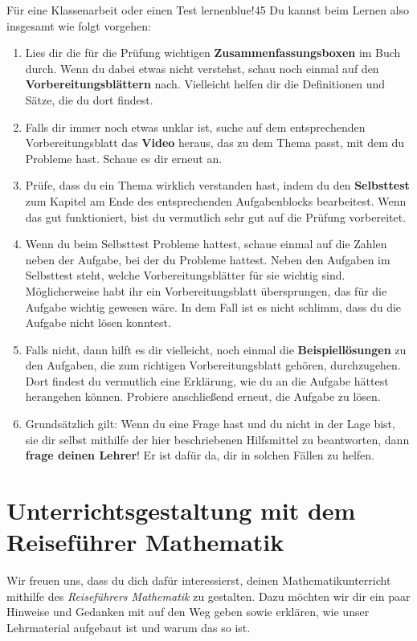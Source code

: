 \documentclass[../main.tex]{subfiles}
\begin{document}
\begin{goal}{Für eine Klassenarbeit oder einen Test lernen}{blue!45}
    Du kannst beim Lernen also insgesamt wie folgt vorgehen:
    \begin{enumerate}
        \item[\tikzball{blue!50!black}{1}] Lies dir die für die Prüfung wichtigen \textbf{Zusammenfassungsboxen} im Buch durch. Wenn du dabei etwas nicht verstehst, schau noch einmal auf den \textbf{Vorbereitungsblättern} nach. Vielleicht helfen dir die Definitionen und Sätze, die du dort findest.
        \item[\tikzball{blue!50!black}{2}] Falls dir immer noch etwas unklar ist, suche auf dem entsprechenden Vorbereitungsblatt das \textbf{Video} heraus, das zu dem Thema passt, mit dem du Probleme hast. Schaue es dir erneut an.
        \item[\tikzball{blue!50!black}{3}] Prüfe, dass du ein Thema wirklich verstanden hast, indem du den \textbf{Selbsttest} zum Kapitel am Ende des entsprechenden Aufgabenblocks bearbeitest. Wenn das gut funktioniert, bist du vermutlich sehr gut auf die Prüfung vorbereitet.
        \item[\tikzball{blue!50!black}{4}] Wenn du beim Selbsttest Probleme hattest, schaue einmal auf die Zahlen neben der Aufgabe, bei der du Probleme hattest. Neben den Aufgaben im Selbsttest steht, welche Vorbereitungsblätter für sie wichtig sind. Möglicherweise habt ihr ein Vorbereitungsblatt übersprungen, das für die Aufgabe wichtig gewesen wäre. In dem Fall ist es nicht schlimm, dass du die Aufgabe nicht lösen konntest. 
        \item[\tikzball{blue!50!black}{5}] Falls nicht, dann hilft es dir vielleicht, noch einmal die \textbf{Beispiellösungen} zu den Aufgaben, die zum richtigen Vorbereitungsblatt gehören, durchzugehen. Dort findest du vermutlich eine Erklärung, wie du an die Aufgabe hättest herangehen können. Probiere anschließend erneut, die Aufgabe zu lösen.
        \item[\tikzball{blue!50!black}{6}] Grundsätzlich gilt: Wenn du eine Frage hast und du nicht in der Lage bist, sie dir selbst mithilfe der hier beschriebenen Hilfsmittel zu beantworten, dann \textbf{frage deinen Lehrer}! Er ist dafür da, dir in solchen Fällen zu helfen.
    \end{enumerate}
\end{goal}

\newpage

\section*{Unterrichtsgestaltung mit dem Reiseführer Mathematik}
Wir freuen uns, dass du dich dafür interessierst, deinen Mathematikunterricht mithilfe des \emph{Reiseführers Mathematik} zu gestalten. Dazu möchten wir dir ein paar Hinweise und Gedanken mit auf den Weg geben sowie erklären, wie unser Lehrmaterial aufgebaut ist und warum das so ist.
\end{document}
